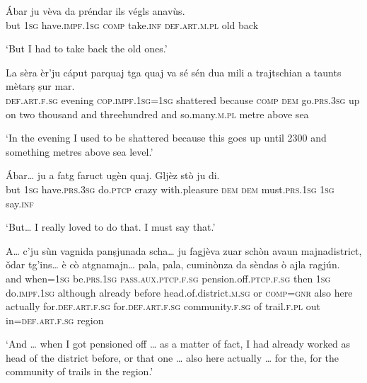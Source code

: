 \begin{linenumbers}
\gll Ábar ju vèva da préndar ils végls anavùs.   \\
but \textsc{1sg} have.\textsc{impf.1sg} \textsc{comp} take.\textsc{inf} \textsc{def.art.m.pl} old back \\
\end{linenumbers}
\medskip
\glt `But I had to take back the old ones.'
\medskip

\begin{linenumbers}
\gll  La sèra èr’ju cáput parquaj tga quaj va sé sén dua mili a trajtschian a taunts mètarṣ ṣur mar.  \\
 \textsc{def.art.f.sg} evening \textsc{cop.impf.1sg=1sg} shattered because \textsc{comp} \textsc{dem} go.\textsc{prs.3sg} up on two thousand and threehundred and  so.many.\textsc{m.pl} metre above sea\\
\end{linenumbers}
\medskip
\glt `In the evening I used to be shattered because this goes up until 2300 and something metres above sea level.'
\medskip

\begin{linenumbers}
\gll  Ábar… ju a fatg faruct ugèn quaj. Gljèz stò ju di.  \\
but \textsc{1sg} have.\textsc{prs.3sg} do.\textsc{ptcp} crazy with.pleasure \textsc{dem} \textsc{dem} must.\textsc{prs.1sg} \textsc{1sg} say.\textsc{inf}\\ 
\end{linenumbers}
\medskip
\glt `But… I really loved to do that. I must say that.'
\medskip

\begin{linenumbers}
\gll  A… c’ju sùn vagnida panṣjunada scha… ju fagjèva zuar schòn avaun majnadistrict, ǒdar tg’ins… è cò atgnamajn… pala, pala, cuminònza da sèndas ò ajla ragjún.  \\
and when=\textsc{1sg} be.\textsc{prs.1sg} \textsc{pass.aux.ptcp.f.sg} pension.off.\textsc{ptcp.f.sg} then \textsc{1sg}  do.\textsc{impf.1sg} although already before head.of.district.\textsc{m.sg} or \textsc{comp=gnr} also here actually for.\textsc{def.art.f.sg} for.\textsc{def.art.f.sg} community.\textsc{f.sg} of trail.\textsc{f.pl} out in=\textsc{def.art.f.sg} region\\
\end{linenumbers}
\medskip
\glt `And … when I got pensioned off … as a matter of fact, I had already worked as head of the district before, or that one … also here actually … for the, for the community of trails in the region.'
\medskip
 
